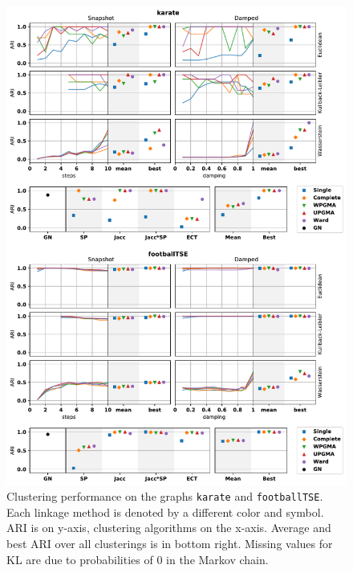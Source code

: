 \begin{figure}
  \centering
  \includegraphics[height=.95\textheight]{power/ARI1.pdf}
  \caption[Experimental clustering results for \texttt{karate} and \texttt{footballTSE}]{Clustering performance on the graphs \texttt{karate} and \texttt{footballTSE}. Each linkage method is denoted by a different color and symbol.
  ARI is on y-axis, clustering algorithms on the x-axis.
  Average and best ARI over all clusterings is in bottom right. Missing values for KL are due to probabilities of 0 in the Markov chain.}
  \label{fig:ARI1}
\end{figure}
